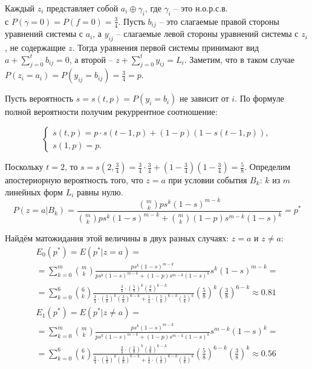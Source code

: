 \documentclass[letterpaper,11pt,openany]{book}
\begin{document}
Каждый $z_i$ представляет собой $a_i \oplus \gamma_i$, где $\gamma_i$ -- это н.о.р.с.в. \\ с $P(\gamma = 0) = P(f = 0) = \frac{3}{4}$. Пусть $b_{ij}$ -- это слагаемые правой стороны уравнений системы с $a_i$, а $y_{ij}$ -- слагаемые левой стороны уравнений системы с $z_i$, не содержащие $z$. Тогда уравнения первой системы принимают вид $a + \sum_{j=0}^{t}b_{ij} = 0$, а второй -- $z + \sum_{j=0}^{t}y_{ij} = L_i$. Заметим, что в таком случае $P(z_i = a_i) = P(y_{ij} = b_{ij}) = \frac{3}{4} = p$.

Пусть вероятность $s = s(t, p) = P(y_i = b_i)$ не зависит от $i$. По формуле полной вероятности получим рекуррентное соотношение:

\begin{equation*}
\begin{cases}
s(t,p) = p \cdot s(t-1, p) + (1-p)(1-s(t-1, p)), \\
s(1,p) = p.
\end{cases}
\end{equation*}

Поскольку $t=2$, то $s = s(2, \frac{3}{4}) = \frac{3}{4} \cdot \frac{3}{4} + (1-\frac{3}{4})(1-\frac{3}{4}) = \frac{5}{8}$. Определим апостериорную вероятность того, что $z=a$ при условии события $B_k$: $k$ из $m$ линейных форм $L_i$ равны нулю.
$$P(z=a|B_k) = \frac{\binom{m}{k} p s^k (1-s)^{m-k}}{\binom{m}{k} p s^k (1-s)^{m-k} + \binom{m}{k} (1-p) s^{m - k} (1-s)^k} = p^*$$

Найдём матожидания этой величины в двух разных случаях: $z=a$ и $z \ne a$:
\begin{multline*}
E_0 (p^*) = E(p^*|z=a) = \\ = \sum_{k=0}^{m} \binom{m}{k} \frac{p s^k (1-s)^{m-k}}{p s^k (1-s)^{m-k} + (1-p) s^{m - k} (1-s)^k} s^k (1-s)^{m-k} = \\
= \sum_{k=0}^{6} \binom{6}{k} \frac{\frac{3}{4} \cdot (\frac{5}{8})^k (\frac{3}{8})^{6-k}}{\frac{3}{4} \cdot (\frac{5}{8})^k (\frac{3}{8})^{6-k} + \frac{1}{4} \cdot (\frac{5}{8})^{6 - k} (\frac{3}{8})^k} \left( \frac{5}{8} \right)^k \left( \frac{3}{8} \right)^{6-k} \approx 0.81
\end{multline*}
\begin{multline*}
E_1 (p^*) = E(p^*|z \ne a) = \\ = \sum_{k=0}^{m} \binom{m}{k} \frac{p s^k (1-s)^{m-k}}{p s^k (1-s)^{m-k} + (1-p) s^{m - k} (1-s)^k} s^{m-k} (1-s)^k = \\
= \sum_{k=0}^{6} \binom{6}{k} \frac{\frac{3}{4} \cdot (\frac{5}{8})^k (\frac{3}{8})^{6-k}}{\frac{3}{4} \cdot (\frac{5}{8})^k (\frac{3}{8})^{6-k} + \frac{1}{4} \cdot (\frac{5}{8})^{6 - k} (\frac{3}{8})^k} \left( \frac{5}{8} \right)^{6-k} \left( \frac{3}{8} \right)^{k} \approx 0.56
\end{multline*}
\end{document}
